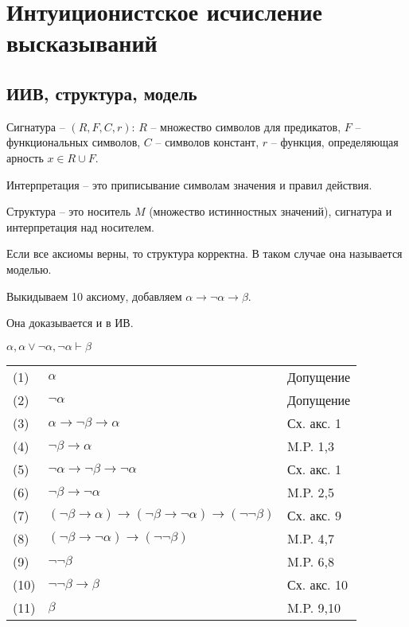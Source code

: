 \section{Интуиционистское исчисление высказываний}
\label{sec-5}
\subsection{ИИВ, структура, модель}
\label{sec-5-1}

Сигнатура -- $(R, F, C, r)$: $R$ -- множество символов для предикатов, $F$ -- функциональных символов, $C$ -- символов констант, $r$ -- функция, определяющая арность $x \in R \cup F$. 

Интерпретация -- это приписывание символам значения и правил действия.

Структура -- это носитель $M$ (множество истинностных значений), сигнатура и интерпретация над носителем.

Если все аксиомы верны, то структура корректна.
В таком случае она называется моделью.

Выкидываем 10 аксиому, добавляем $\alpha \rightarrow \neg \alpha \rightarrow \beta$.

Она доказывается и в ИВ.
\begin{lemma}\label{provability}
$\alpha, \alpha \vee \neg \alpha, \neg \alpha \vdash \beta$
\end{lemma}
\begin{tabular}{lll}
(1) & $\alpha$& Допущение\\
(2) & $\neg \alpha$& Допущение\\
(3) & $\alpha \rightarrow \neg \beta \rightarrow \alpha$& Сх. акс. 1\\
(4) & $\neg \beta \rightarrow \alpha$& M.P. 1,3\\
(5) & $\neg \alpha \rightarrow \neg \beta \rightarrow \neg \alpha$& Сх. акс. 1\\
(6) & $\neg \beta \rightarrow \neg \alpha$& M.P. 2,5\\
(7) & $(\neg \beta \rightarrow \alpha) \rightarrow (\neg \beta \rightarrow \neg \alpha) \rightarrow (\neg \neg \beta)$& Сх. акс. 9\\
(8) & $(\neg \beta \rightarrow \neg \alpha) \rightarrow (\neg \neg \beta)$& M.P. 4,7\\
(9) & $\neg \neg \beta$& M.P. 6,8\\
(10) & $\neg \neg \beta \rightarrow \beta$& Сх. акс. 10\\
(11) & $\beta$& M.P. 9,10\\
\end{tabular}


